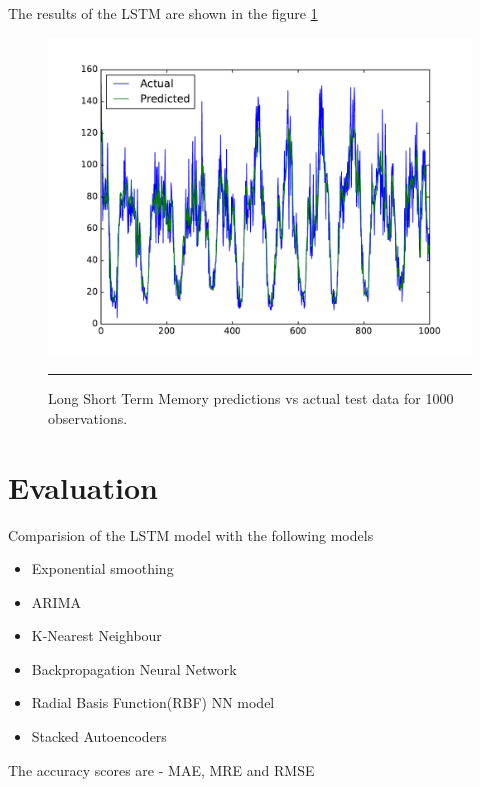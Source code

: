 The results of the LSTM are shown in the figure \ref{fig:LstmActualPredicted}

\begin{figure}[htbp]
  \centering
    \includegraphics[width=\textwidth,height=\textheight,keepaspectratio]{Figures/lstm.pdf}
    \rule{35em}{0.5pt}
  \caption[LSTM - Actual vs Predictions]{Long Short Term Memory predictions vs actual test data for
  1000 observations.}
  \label{fig:LstmActualPredicted}
\end{figure}

\section{Evaluation}

Comparision of the LSTM model with the following models

\begin{itemize}
\item Exponential smoothing
\item ARIMA
\item K-Nearest Neighbour
\item Backpropagation Neural Network
\item Radial Basis Function(RBF) NN model
\item Stacked Autoencoders
\end{itemize}

The accuracy scores are - MAE, MRE and RMSE